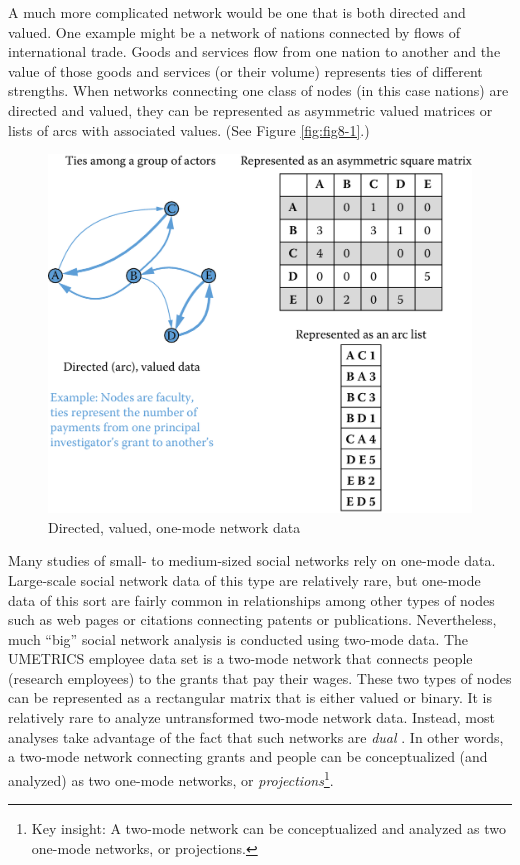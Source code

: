 \documentclass[]{krantz}
\begin{document}
A much more complicated network would be one that is both directed and
valued. One example might be a network of nations connected by flows of
international trade. Goods and services flow from one nation to another
and the value of those goods and services (or their volume) represents
ties of different strengths. When networks connecting one class of nodes
(in this case nations) are directed and valued, they can be represented
as asymmetric valued matrices or lists of arcs with associated values.
(See Figure \ref{fig:fig8-1}.)

\begin{figure}

{\centering \includegraphics[width=0.7\linewidth]{ChapterNetworks/figures/fig8-2} 

}

\caption{Directed, valued, one-mode network data}\label{fig:fig8-2}
\end{figure}

Many studies of small- to medium-sized social networks rely on one-mode
data. Large-scale social network data of this type are relatively rare,
but one-mode data of this sort are fairly common in relationships among
other types of nodes such as web pages or citations connecting patents
or publications. Nevertheless, much ``big'' social network analysis is
conducted using two-mode data. The UMETRICS employee data set is a
two-mode network that connects people (research employees) to the grants
that pay their wages. These two types of nodes can be represented as a
rectangular matrix that is either valued or binary. It is relatively
rare to analyze untransformed two-mode network data. Instead, most
analyses take advantage of the fact that such networks are \emph{dual}
\citep{white1976social}. In other words, a two-mode network connecting
grants and people can be conceptualized (and analyzed) as two one-mode
networks, or \emph{projections}\footnote{Key insight: A two-mode network
  can be conceptualized and analyzed as two one-mode networks, or
  projections.}.
\end{document}
